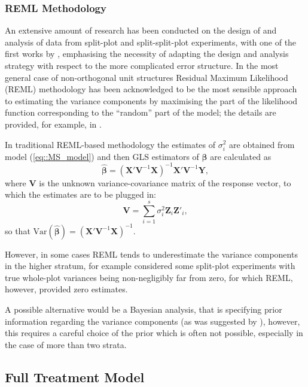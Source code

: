 \subsubsection{REML Methodology}
An extensive amount of research has been conducted on the design of and analysis of data from split-plot and split-split-plot experiments, with one of the first works by \cite{Letsinger1996BiRandomization}, emphasising the necessity of adapting the design and analysis strategy with respect to the more complicated error structure.  In the most general case of non-orthogonal unit structures Residual Maximum Likelihood (REML) methodology has been acknowledged to be the most sensible approach to estimating the variance components by maximising the part of the likelihood function corresponding to the ``random'' part of the model; the details are provided, for example, in \cite{Searle2001generalized}. 

In traditional REML-based methodology the estimates of $\sigma^{2}_{i}$ are obtained from model (\ref{eq::MS_model}) and then GLS estimators of $\bm{\beta}$ are calculated as
\begin{equation}
\label{eq::MS_GLS}
\bm{\hat{\beta}}=(\bm{X}'\bm{V}^{-1}\bm{X})^{-1}\bm{X}'\bm{V}^{-1}\bm{Y},
\end{equation}
where $\bm{V}$ is the unknown variance-covariance matrix of the response vector, to which the estimates are to be plugged in:
\begin{equation*}
\bm{V}=\sum_{i=1}^{s}\sigma^{2}_{i}\bm{Z}_{i}\bm{Z}'_{i},
\end{equation*}
so that $\mbox{Var}(\bm{\hat{\beta}})=(\bm{X}'\bm{V}^{-1}\bm{X})^{-1}.$

However, in some cases REML tends to underestimate the variance components in the higher stratum, for example \cite{Goos2006practical} considered some split-plot experiments with true whole-plot variances being non-negligibly far from zero, for which REML, however, provided zero estimates. 

A possible alternative would be a Bayesian analysis, that is specifying prior information regarding the variance components (as was suggested by \cite{Gilmour2009analysis}), however, this requires a careful choice of the prior which is often not possible, especially in the case of more than two strata.

\subsection{Full Treatment Model}

